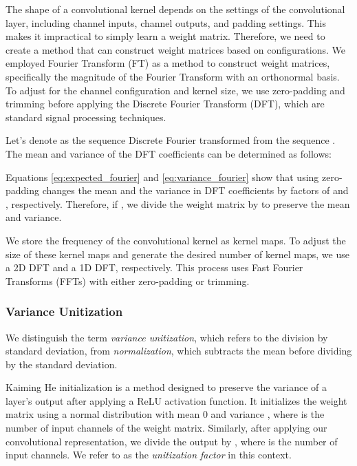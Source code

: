 \documentclass[lettersize,journal]{IEEEtran}
\begin{document}
    The shape of a convolutional kernel depends on the settings of the convolutional layer, including channel inputs, channel outputs, and padding settings. This makes it impractical to simply learn a weight matrix. Therefore, we need to create a method that can construct weight matrices based on configurations. We employed Fourier Transform (FT) as a method to construct weight matrices, specifically the magnitude of the Fourier Transform with an orthonormal basis. To adjust for the channel configuration and kernel size, we use zero-padding and trimming before applying the Discrete Fourier Transform (DFT), which are standard signal processing techniques.
    
    Let's denote  as the sequence Discrete Fourier transformed from the sequence . The mean and variance of the DFT coefficients can be determined as follows:
    
    
    
    
    
    Equations \ref{eq:expected_fourier} and \ref{eq:variance_fourier} show that using zero-padding changes the mean and the variance in DFT coefficients by factors of  and , respectively. Therefore, if , we divide the weight matrix by  to preserve the mean and variance.
    
    We store the frequency of the convolutional kernel as  kernel maps. To adjust the size of these kernel maps and generate the desired number of kernel maps, we use a 2D DFT and a 1D DFT, respectively. This process uses Fast Fourier Transforms (FFTs) with either zero-padding or trimming.

    \subsubsection{Variance Unitization}
        We distinguish the term \emph{variance unitization}, which refers to the division by standard deviation, from \emph{normalization}, which subtracts the mean before dividing by the standard deviation.
        
        Kaiming He initialization is a method designed to preserve the variance of a layer's output after applying a ReLU activation function. It initializes the weight matrix using a normal distribution with mean 0 and variance , where  is the number of input channels of the weight matrix. Similarly, after applying our convolutional representation, we divide the output by , where  is the number of input channels. We refer to  as the \emph{unitization factor} in this context.
        
\end{document}
